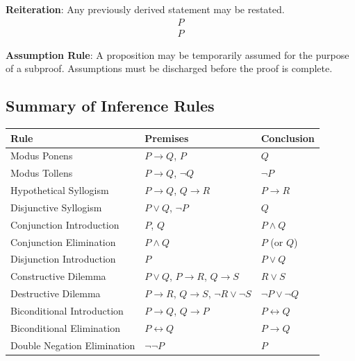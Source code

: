 \begin{definition}[Reiteration]
\textbf{Reiteration}: Any previously derived statement may be restated.
\[
\begin{array}{l}
P \\ \hline
P
\end{array}
\]
\end{definition}

\begin{definition}[Assumption]
\textbf{Assumption Rule}: A proposition may be temporarily assumed for the
purpose of a subproof. Assumptions must be discharged before the proof is
complete.
\end{definition}

\subsection{Summary of Inference Rules}

\begin{center}
\renewcommand{\arraystretch}{1.3}
\begin{tabular}{|l|l|l|}
\hline
\textbf{Rule} & \textbf{Premises} & \textbf{Conclusion} \\
\hline
Modus Ponens & $P \rightarrow Q$, $P$ & $Q$ \\
Modus Tollens & $P \rightarrow Q$, $\neg Q$ & $\neg P$ \\
Hypothetical Syllogism & $P \rightarrow Q$, $Q \rightarrow R$ & $P \rightarrow R$ \\
Disjunctive Syllogism & $P \vee Q$, $\neg P$ & $Q$ \\
Conjunction Introduction & $P$, $Q$ & $P \wedge Q$ \\
Conjunction Elimination & $P \wedge Q$ & $P$ (or $Q$) \\
Disjunction Introduction & $P$ & $P \vee Q$ \\
Constructive Dilemma & $P \vee Q$, $P \rightarrow R$, $Q \rightarrow S$ & $R \vee S$ \\
Destructive Dilemma & $P \rightarrow R$, $Q \rightarrow S$, $\neg R \vee \neg S$ & $\neg P \vee \neg Q$ \\
Biconditional Introduction & $P \rightarrow Q$, $Q \rightarrow P$ & $P \leftrightarrow Q$ \\
Biconditional Elimination & $P \leftrightarrow Q$ & $P \rightarrow Q$ \\
Double Negation Elimination & $\neg\neg P$ & $P$ \\
\hline
\end{tabular}
\end{center}

